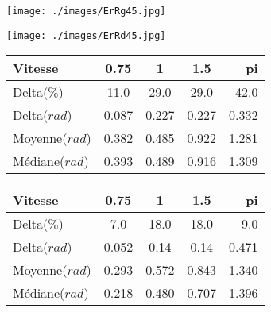 \documentclass[10pt,a4paper]{article}
\begin{document}
\begin{figure}[!]
    \begin{minipage}[c]{.46\linewidth}
        \centering
        \texttt{[image: ./images/ErRg45.jpg]}
    \end{minipage}
     \hfill%
    \begin{minipage}[c]{.46\linewidth}
        \centering
        \texttt{[image: ./images/ErRd45.jpg]}
    \end{minipage}
\end{figure}

\begin{figure}[!]
    \begin{minipage}[c]{.46\linewidth}
        \centering
        \begin{tabular}{|l|c|c|c|r|}
 		\hline
  		Vitesse & 0.75 & 1 & 1.5 & pi \\
  		\hline
  		Delta($\%$) & 11.0 & 29.0 & 29.0 & 42.0 \\
  		\hline
  		Delta($rad$) & 0.087 & 0.227 & 0.227 & 0.332 \\
  		\hline
  		Moyenne($rad$) & 0.382 & 0.485 & 0.922 & 1.281 \\
  		\hline
  		Médiane($rad$) & 0.393 & 0.489 & 0.916 & 1.309 \\
  		\hline
		\end{tabular}
    \end{minipage}\hfill%
    \begin{minipage}[c]{.46\linewidth}
        \centering
        \begin{tabular}{|l|c|c|c|r|}
 		\hline
  		Vitesse & 0.75 & 1 & 1.5 & pi \\
  		\hline
  		Delta($\%$) & 7.0 & 18.0 & 18.0 & 9.0 \\
  		\hline
  		Delta($rad$) & 0.052 & 0.14 & 0.14 & 0.471 \\
  		\hline
  		Moyenne($rad$) & 0.293 & 0.572 & 0.843 & 1.340 \\
  		\hline
  		Médiane($rad$) & 0.218 & 0.480 & 0.707 & 1.396 \\
  		\hline
		\end{tabular}
    \end{minipage}
\end{figure}
\end{document}
